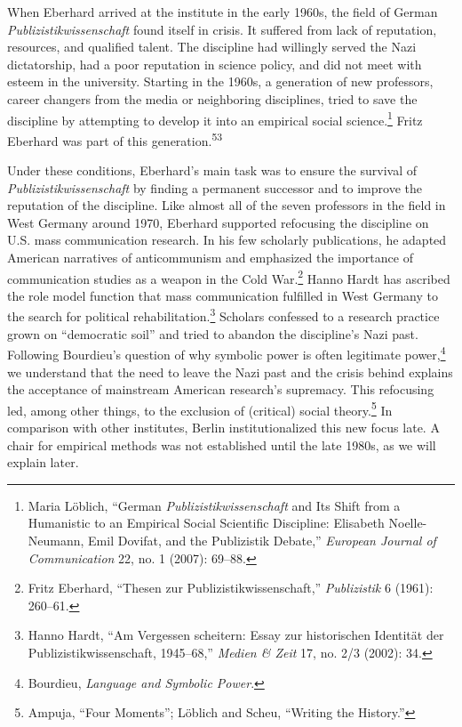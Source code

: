 \documentclass{tufte-handout}
\begin{document}
When Eberhard arrived at the institute in the early 1960s, the field of
German \emph{Publizistikwissenschaft} found itself in crisis. It
suffered from lack of reputation, resources, and qualified talent. The
discipline had willingly served the Nazi dictatorship, had a poor
reputation in science policy, and did not meet with esteem in the
university. Starting in the 1960s, a generation of new professors,
career changers from the media or neighboring disciplines, tried to save
the discipline by attempting to develop it into an empirical social
science.\footnote{Maria Löblich, ``German \emph{Publizistikwissenschaft}
  and Its Shift from a Humanistic to an Empirical Social Scientific
  Discipline: Elisabeth Noelle-Neumann, Emil Dovifat, and the
  Publizistik Debate,'' \emph{European Journal of Communication} 22, no.
  1 (2007): 69--88.} Fritz Eberhard was part of this
generation.\textsuperscript{53}

\enlargethispage{1\baselineskip}

Under these conditions, Eberhard's main task was to ensure the survival
of \emph{Publizistikwissenschaft} by finding a permanent successor and
to improve the reputation of the discipline. Like almost all of the
seven professors in the field in West Germany around 1970, Eberhard
supported refocusing the discipline on U.S. mass communication research.
In his few scholarly publications, he adapted American narratives of
anticommunism and emphasized the importance of communication studies as
a weapon in the Cold War.\footnote{Fritz Eberhard, ``Thesen zur
  Publizistikwissenschaft,'' \emph{Publizistik} 6 (1961): 260--61.}
Hanno Hardt has ascribed the role model function that mass communication
fulfilled in West Germany to the search for political
rehabilitation.\footnote{Hanno Hardt, ``Am Vergessen scheitern: Essay
  zur historischen Identität der Publizistikwissenschaft, 1945--68,''
  \emph{Medien \& Zeit} 17, no. 2/3 (2002): 34.} Scholars confessed to a
research practice grown on ``democratic soil'' and tried to abandon the
discipline's Nazi past. Following Bourdieu's question of why symbolic
power is often legitimate power,\footnote{Bourdieu, \emph{Language and
  Symbolic Power}.} we understand that the need to leave the Nazi past
and the crisis behind explains the acceptance of mainstream American
research's supremacy. This refocusing led, among other things, to the
exclusion of (critical) social theory.\footnote{Ampuja, ``Four
  Moments''; Löblich and Scheu, ``Writing the History.''} In comparison
with other institutes, Berlin institutionalized this new focus late. A
chair for empirical methods was not established until the late 1980s, as
we will explain later.
\end{document}
